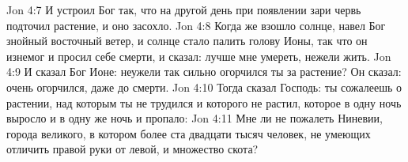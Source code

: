 Jon 4:7  И устроил Бог так, что на другой день при появлении зари червь подточил растение, и оно засохло.
Jon 4:8  Когда же взошло солнце, навел Бог знойный восточный ветер, и солнце стало палить голову Ионы, так что он изнемог и просил себе смерти, и сказал: лучше мне умереть, нежели жить.
Jon 4:9  И сказал Бог Ионе: неужели так сильно огорчился ты за растение? Он сказал: очень огорчился, даже до смерти.
Jon 4:10  Тогда сказал Господь: ты сожалеешь о растении, над которым ты не трудился и которого не растил, которое в одну ночь выросло и в одну же ночь и пропало:
Jon 4:11  Мне ли не пожалеть Ниневии, города великого, в котором более ста двадцати тысяч человек, не умеющих отличить правой руки от левой, и множество скота?


